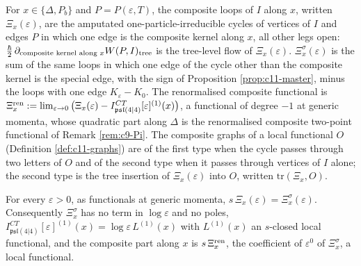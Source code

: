 \begin{definition}
\label{def:c11-Xi}
For $x\in\{\Delta,P_b\}$ and $P=P(\varepsilon,T)$, the composite loops of $I$ along $x$, written $\Xi_x(\varepsilon)$, are the amputated one-particle-irreducible cycles of vertices of $I$ and edges $P$ in which one edge is the composite kernel along $x$, all other legs open: $\tfrac\hbar2\,\partial_{\text{composite kernel along }x}W(P,I)_{\rm tree}$ is the tree-level flow of $\Xi_x(\varepsilon)$. $\Xi^\sigma_x(\varepsilon)$ is the sum of the same loops in which one edge of the cycle other than the composite kernel is the special edge, with the sign of Proposition \ref{prop:c11-master}, minus the loops with one edge $K_\varepsilon-K_0$. The renormalised composite functional is $\Xi^{\rm ren}_x:=\lim_{\varepsilon\to0}\big(\Xi_x(\varepsilon)-I^{CT}_{\mathfrak{psl}(4|4)}[\varepsilon]^{(1)}(x)\big)$, a functional of degree $-1$ at generic momenta, whose quadratic part along $\Delta$ is the renormalised composite two-point functional of Remark \ref{rem:c9-Pi}. The composite graphs of a local functional $O$ (Definition \ref{def:c11-graphs}) are of the first type when the cycle passes through two letters of $O$ and of the second type when it passes through vertices of $I$ alone; the second type is the tree insertion of $\Xi_x(\varepsilon)$ into $O$, written $\mathrm{tr}(\Xi_x,O)$.
\end{definition}

\begin{lemma}
\label{lem:c11-Cid}
For every $\varepsilon>0$, as functionals at generic momenta, $s\,\Xi_x(\varepsilon)=\Xi^\sigma_x(\varepsilon)$. Consequently $\Xi^\sigma_x$ has no term in $\log\varepsilon$ and no poles, $I^{CT}_{\mathfrak{psl}(4|4)}[\varepsilon]^{(1)}(x)=\log\varepsilon\,L^{(1)}(x)$ with $L^{(1)}(x)$ an $s$-closed local functional, and the composite part along $x$ is $s\,\Xi^{\rm ren}_x$, the coefficient of $\varepsilon^0$ of $\Xi^\sigma_x$, a local functional.
\end{lemma}

